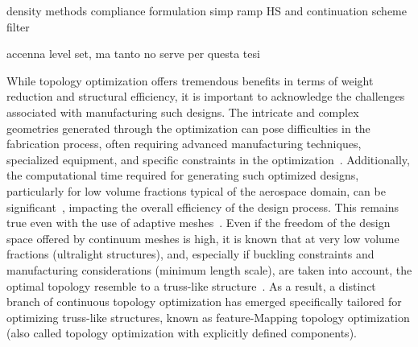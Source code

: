 density methods
compliance formulation
simp ramp HS and continuation scheme
filter

accenna level set, ma tanto no serve per questa tesi

While topology optimization offers tremendous benefits in terms of weight reduction and structural efficiency, it is important to acknowledge the challenges associated with manufacturing such designs. The intricate and complex geometries generated through the optimization can pose difficulties in the fabrication process, often requiring advanced manufacturing techniques, specialized equipment, and specific constraints in the optimization~. Additionally, the computational time required for generating such optimized designs, particularly for low volume fractions typical of the aerospace domain, can be significant~, impacting the overall efficiency of the design process. This remains true even with the use of adaptive meshes~. Even if the freedom of the design space offered by continuum meshes is high, it is known that at very low volume fractions (\eg ultralight structures), and, especially if buckling constraints and manufacturing considerations (\eg minimum length scale), are taken into account, the optimal topology resemble to a truss-like structure~. As a result, a distinct branch of continuous topology optimization has emerged specifically tailored for optimizing truss-like structures, known as feature-Mapping topology optimization (also called topology optimization with explicitly defined components).

